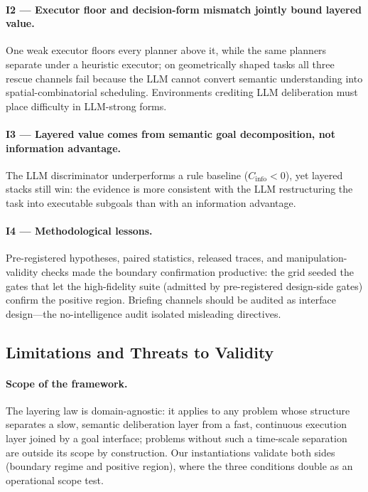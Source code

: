 \documentclass[sigconf,anonymous]{aamas}
\newcommand{\Cinfo}{C_{\mathrm{info}}}
\begin{document}
\paragraph{I2 --- Executor floor and decision-form mismatch jointly bound layered value.}
One weak executor floors every planner above it, while the same planners separate under a heuristic executor; on geometrically shaped tasks all three rescue channels fail because the LLM cannot convert semantic understanding into spatial-combinatorial scheduling. Environments crediting LLM deliberation must place difficulty in LLM-strong forms.

\paragraph{I3 --- Layered value comes from semantic goal decomposition, not information advantage.}
The LLM discriminator underperforms a rule baseline ($\Cinfo < 0$), yet layered stacks still win: the evidence is more consistent with the LLM restructuring the task into executable subgoals than with an information advantage.
\paragraph{I4 --- Methodological lessons.}
Pre-registered hypotheses, paired statistics, released traces, and manipulation-validity checks made the boundary confirmation productive: the grid seeded the gates that let the high-fidelity suite (admitted by pre-registered design-side gates) confirm the positive region. Briefing channels should be audited as interface design---the no-intelligence audit isolated misleading directives.

\subsection{Limitations and Threats to Validity}\label{sec:limitations}

\paragraph{Scope of the framework.}
The layering law is domain-agnostic: it applies to any problem whose structure separates a slow, semantic deliberation layer from a fast, continuous execution layer joined by a goal interface; problems without such a time-scale separation are outside its scope by construction. Our instantiations validate both sides (boundary regime and positive region), where the three conditions double as an operational scope test.
\end{document}
